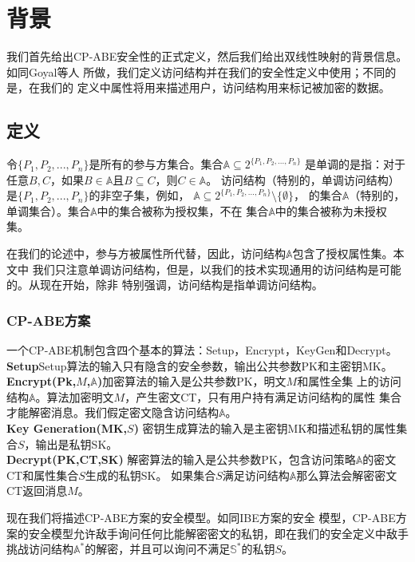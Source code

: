 \chapter{背景}
我们首先给出CP-ABE安全性的正式定义，然后我们给出双线性映射的背景信息。如同Goyal等人
\cite{GPSW:ABE}所做，我们定义访问结构并在我们的安全性定义中使用；不同的是，在我们的
定义中属性将用来描述用户，访问结构用来标记被加密的数据。
\section{定义}
\begin{Definition}
令$\{P_1,P_2,...,P_n\}$是所有的参与方集合。集合$\mathbb{A}\subseteq 2^{\{P_1,P_2,...,P_n\}}$
是单调的是指：对于任意$B,C$，如果$B\in\mathbb{A}$且$B\subseteq C$，则$C\in\mathbb{A}$。
访问结构（特别的，单调访问结构）是$\{P_1,P_2,...,P_n\}$的非空子集，例如，
$\mathbb{A}\subseteq 2^{\{P_1,P_2,...,P_n\}}\setminus\{\emptyset\}$，
的集合$\mathbb{A}$（特别的，单调集合）。集合$\mathbb{A}$中的集合被称为授权集，不在
集合$\mathbb{A}$中的集合被称为未授权集。
\end{Definition}
\par
在我们的论述中，参与方被属性所代替，因此，访问结构$\mathbb{A}$包含了授权属性集。本文中
我们只注意单调访问结构，但是，以我们的技术实现通用的访问结构是可能的。从现在开始，除非
特别强调，访问结构是指单调访问结构。\par
\subsection{CP-ABE方案}
一个CP-ABE机制包含四个基本的算法：Setup，Encrypt，KeyGen和Decrypt。\\
\textbf{Setup}\quad Setup算法的输入只有隐含的安全参数，输出公共参数PK和主密钥MK。\\
\textbf{Encrypt(Pk,$M$,$\mathbb{A}$)}\quad 加密算法的输入是公共参数PK，明文$M$和属性全集
上的访问结构$\mathbb{A}$。算法加密明文$M$，产生密文CT，只有用户持有满足访问结构的属性
集合才能解密消息。我们假定密文隐含访问结构$\mathbb{A}$。\\
\textbf{Key Generation(MK,$S$)}\quad
密钥生成算法的输入是主密钥MK和描述私钥的属性集合$S$，输出是私钥SK。\\
\textbf{Decrypt(PK,CT,SK)}\quad
解密算法的输入是公共参数PK，包含访问策略$\mathbb{A}$的密文CT和属性集合$S$生成的私钥SK。
如果集合$S$满足访问结构$\mathbb{A}$那么算法会解密密文CT返回消息$M$。\par
现在我们将描述CP-ABE方案的安全模型。如同IBE方案\cite{Shamir:IBC,BF:IBE,Cocks:IBE}的安全
模型，CP-ABE方案的安全模型允许敌手询问任何比能解密密文的私钥，即在我们的安全定义中敌手
挑战访问结构$\mathbb{A}^{*}$的解密，并且可以询问不满足$\mathbb{S}^{*}$的私钥$S$。

